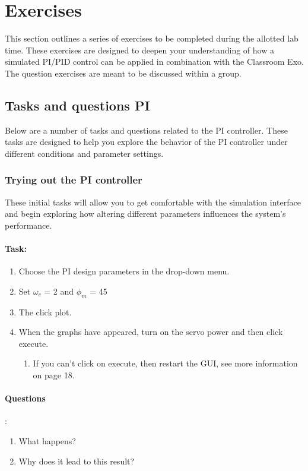 \newpage
\section{Exercises}
This section outlines a series of exercises to be completed during the allotted lab time. These exercises are designed to deepen your understanding of how a simulated PI/PID control can be applied in combination with the Classroom Exo. The question exercises are meant to be discussed within a group. 

\subsection{Tasks and questions PI}
Below are a number of tasks and questions related to the PI controller. These tasks are designed to help you explore the behavior of the PI controller under different conditions and parameter settings.

\subsubsection{Trying out the PI controller}
These initial tasks will allow you to get comfortable with the simulation interface and begin exploring how altering different parameters influences the system's performance.
\paragraph{Task:}
\begin{enumerate}[]
	\item Choose the PI design parameters in the drop-down menu.
	\item Set $\omega_c$ = 2 and  $\phi_m$ = 45
	\item The click plot.
	\item When the graphs have appeared, turn on the servo power and then click execute. 
	\begin{enumerate}[]
		\item If you can’t click on execute, then restart the GUI, see more information on page 18.
	\end{enumerate}
\end{enumerate}

\paragraph{Questions}:
\begin{enumerate}[]
	\item What happens?
	\item Why does it lead to this result?
\end{enumerate}

